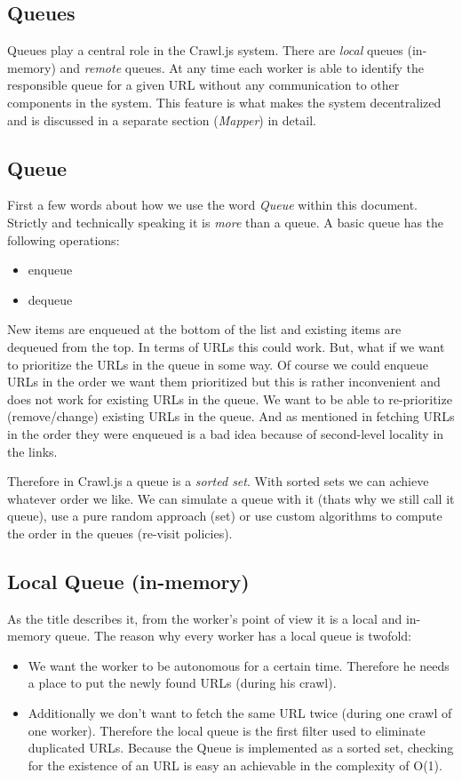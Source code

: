 \begin{itemize}
\section{Queues}
Queues play a central role in the Crawl.js system. There are \emph{local} queues (in-memory) and \emph{remote} queues. At any time each worker is able to identify the responsible queue for a given URL without any communication to other components in the system. This feature is what makes the system decentralized and is discussed in a separate section (\emph{Mapper}) in detail.

\subsection{Queue}
First a few words about how we use the word \emph{Queue} within this document. Strictly and technically speaking it is \emph{more} than a queue. A basic queue has the following operations:
\begin{itemize}
  \item enqueue
  \item dequeue
\end{itemize}

New items are enqueued at the bottom of the list and existing items are dequeued from the top. In terms of URLs this could work. But, what if we want to prioritize the URLs in the queue in some way. Of course we could enqueue URLs in the order we want them prioritized but this is rather inconvenient and does not work for existing URLs in the queue. We want to be able to re-prioritize (remove/change) existing URLs in the queue. And as mentioned in \cite{hp_crawler} fetching URLs in the order they were enqueued is a bad idea because of second-level locality in the links.

Therefore in Crawl.js a queue is a \emph{sorted set}. With sorted sets we can achieve whatever order we like. We can simulate a queue with it (thats why we still call it queue), use a pure random approach (set) or use custom algorithms to compute the order in the queues (re-visit policies).

\subsection{Local Queue (in-memory)}
As the title describes it, from the worker's point of view it is a local and in-memory queue. The reason why every worker has a local queue is twofold:
\begin{itemize}
  \item We want the worker to be autonomous for a certain time. Therefore he needs a place to put the newly found URLs (during his crawl).
  \item Additionally we don't want to fetch the same URL twice (during one crawl of one worker). Therefore the local queue is the first filter used to eliminate duplicated URLs. Because the Queue is implemented as a sorted set, checking for the existence of an URL is easy an achievable in the complexity of O(1).
\end{itemize}


\end{itemize}
